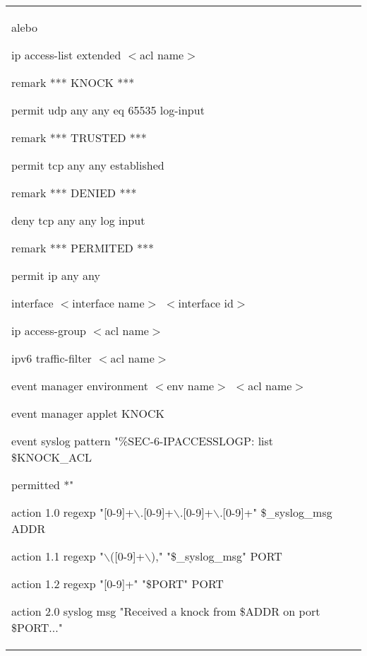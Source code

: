\begin{longtable}[!htbp]{|L{10em}L{10em}>{\selectfont}L{34em}|}
	\vspace{0.5em}
	{\selectfont alebo}
	\vspace{0.5em}
	
	ip access-list extended $<$acl name$>$
	
	\hspace{0.5em}remark *** KNOCK ***
	
	\hspace{0.5em}permit udp any any eq 65535 log-input
	
	\hspace{0.5em}remark *** TRUSTED ***
	
	\hspace{0.5em}permit tcp any any established
	
	\hspace{0.5em}remark *** DENIED ***
	
	\hspace{0.5em}deny   tcp any any log input
	
	\hspace{0.5em}remark *** PERMITED ***
	
	\hspace{0.5em}permit ip any any
	
	
	interface $<$interface name$>$ $<$interface id$>$
	
	\hspace{0.5em}ip access-group $<$acl name$>$
	
	\hspace{0.5em}ipv6 traffic-filter $<$acl name$>$
	
	event manager environment $<$env name$>$ $<$acl name$>$
	
	event manager applet KNOCK
	
	\hspace{0.5em}event syslog pattern "\%SEC-6-IPACCESSLOGP: list \$KNOCK\_ACL
	
	\hspace{1em}permitted *"
	
	\hspace{0.5em}action 1.0 regexp "[0-9]+$\backslash$.[0-9]+$\backslash$.[0-9]+$\backslash$.[0-9]+" \$\_syslog\_msg ADDR
	
	\hspace{0.5em}action 1.1 regexp "$\backslash$([0-9]+$\backslash$)," "\$\_syslog\_msg" PORT
	
	\hspace{0.5em}action 1.2 regexp "[0-9]+" "\$PORT" PORT 
	
	\hspace{0.5em}action 2.0 syslog msg "Received a knock from \$ADDR on port \$PORT..."
	

\end{longtable}
